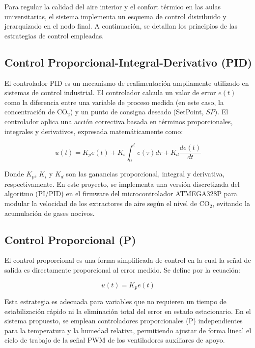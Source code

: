 Para regular la calidad del aire interior y el confort térmico en las aulas universitarias, el sistema implementa un esquema de control distribuido y jerarquizado en el nodo final. A continuación, se detallan los principios de las estrategias de control empleadas.

\subsection{Control Proporcional-Integral-Derivativo (PID)}
El controlador PID es un mecanismo de realimentación ampliamente utilizado en sistemas de control industrial. El controlador calcula un valor de error $e(t)$ como la diferencia entre una variable de proceso medida (en este caso, la concentración de CO\(_2\)) y un punto de consigna deseado (SetPoint, $SP$). El controlador aplica una acción correctiva basada en términos proporcionales, integrales y derivativos, expresada matemáticamente como:

\begin{equation}\label{eq:pid}
	u(t) = K_p e(t) + K_i \int_{0}^{t} e(\tau) d\tau + K_d \frac{de(t)}{dt}
\end{equation}

Donde $K_p$, $K_i$ y $K_d$ son las ganancias proporcional, integral y derivativa, respectivamente. En este proyecto, se implementa una versión discretizada del algoritmo (PI/PID) en el firmware del microcontrolador ATMEGA328P para modular la velocidad de los extractores de aire según el nivel de CO\(_2\), evitando la acumulación de gases nocivos.

\subsection{Control Proporcional (P)}
El control proporcional es una forma simplificada de control en la cual la señal de salida es directamente proporcional al error medido. Se define por la ecuación:

\begin{equation}\label{eq:control_p}
	u(t) = K_p e(t)
\end{equation}

Esta estrategia es adecuada para variables que no requieren un tiempo de estabilización rápido ni la eliminación total del error en estado estacionario. En el sistema propuesto, se emplean controladores proporcionales (P) independientes para la temperatura y la humedad relativa, permitiendo ajustar de forma lineal el ciclo de trabajo de la señal PWM de los ventiladores auxiliares de apoyo.

